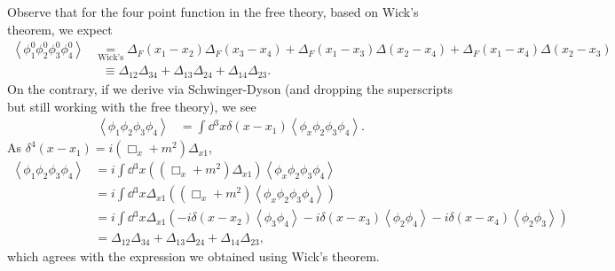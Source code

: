 \begin{example}
    Observe that for the four point function in the free theory, based on Wick's theorem, we expect
    \begin{align}
        \left<\phi_1^{0} \phi_2^{0} \phi_3^{0} \phi_4^{0} \right> &\underset{\text{Wick's}}{=} \Delta_{F} \left( x_1 - x_2 \right) \Delta_{F}\left( x_3 - x_4 \right) + \Delta_F \left( x_1 - x_3 \right) \Delta \left( x_2 - x_4 \right) + \Delta_F \left( x_1 - x_4 \right) \Delta \left( x_2 - x_3 \right) \nonumber \\
        &~~\,\equiv \Delta_{12} \Delta_{34} + \Delta_{13} \Delta_{24} + \Delta_{14} \Delta_{23}
    .\end{align}
    On the contrary, if we derive via Schwinger-Dyson (and dropping the superscripts but still working with the free theory), we see
    \begin{align}
        \left< \phi_1 \phi_2 \phi_3 \phi_4  \right>&= \int \dd{^{3}x} \delta \left( x - x_1 \right) \left< \phi_x \phi_2 \phi_3 \phi_4\right> 
    .\end{align}
    As $\delta^{4}\left( x - x_1 \right) = i\left( \Box_x + m^2 \right)  \Delta_{x1}$,
    \begin{align}
        \left< \phi_1 \phi_2 \phi_3 \phi_4  \right> &= i\int \dd{^{3}x} \left( \left( \Box_x + m^2 \right)  \Delta_{x 1} \right)  \left< \phi_x \phi_2 \phi_3 \phi_4\right>  \\
        &= i\int \dd{^{3}x} \Delta_{x 1}\left( \left( \Box_x + m^2 \right)     \left< \phi_x \phi_2 \phi_3 \phi_4\right> \right) \\
        &= i\int \dd{^{3}x} \Delta_{x 1} \left( -i \delta \left( x - x_2 \right) \left<\phi_3 \phi_4 \right> - i \delta \left( x - x_3 \right) \left<\phi_2 \phi_4 \right> - i \delta \left( x - x_4 \right) \left<\phi_2 \phi_3 \right> \right)     \\
        &= \Delta_{12} \Delta_{34} + \Delta_{13} \Delta_{24} + \Delta_{14} \Delta_{23} 
    ,\end{align}
    which agrees with the expression we obtained using Wick's theorem.
\end{example}

